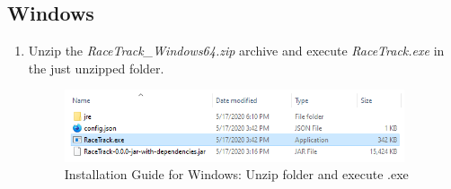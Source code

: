 	\subsection{Windows}
	\begin{enumerate}
		\item Unzip the \textit{RaceTrack\_Windows64.zip} archive and execute \textit{RaceTrack.exe} in the just unzipped folder.
		\begin{figure}[H]
			\centering
			\includegraphics[width=10cm,keepaspectratio,center]{img/Implementation_Installation-Guide_Windows-1.png}
			\caption{Installation Guide for Windows: Unzip folder and execute .exe}
		\end{figure}
	\end{enumerate}
